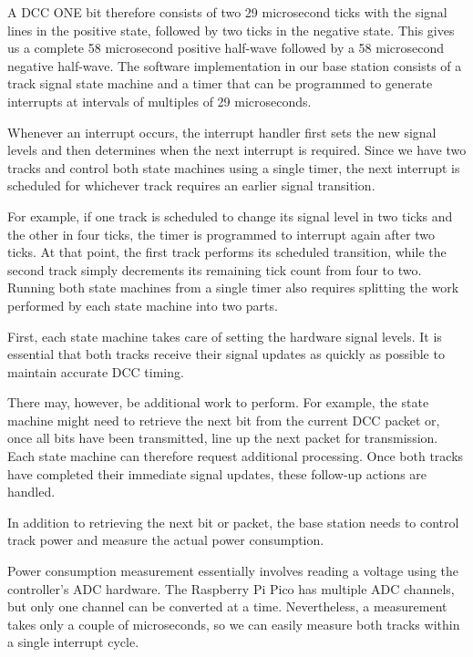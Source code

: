 A DCC ONE bit therefore consists of two 29 microsecond ticks with the signal lines in the positive state, followed by two ticks in the negative state. This gives us a complete 58 microsecond positive half-wave followed by a 58 microsecond negative half-wave.
The software implementation in our base station consists of a track signal state machine and a timer that can be programmed to generate interrupts at intervals of multiples of 29 microseconds.

Whenever an interrupt occurs, the interrupt handler first sets the new signal levels and then determines when the next interrupt is required. Since we have two tracks and control both state machines using a single timer, the next interrupt is scheduled for whichever track requires an earlier signal transition.

For example, if one track is scheduled to change its signal level in two ticks and the other in four ticks, the timer is programmed to interrupt again after two ticks. At that point, the first track performs its scheduled transition, while the second track simply decrements its remaining tick count from four to two.
Running both state machines from a single timer also requires splitting the work performed by each state machine into two parts.

First, each state machine takes care of setting the hardware signal levels. It is essential that both tracks receive their signal updates as quickly as possible to maintain accurate DCC timing.

There may, however, be additional work to perform. For example, the state machine might need to retrieve the next bit from the current DCC packet or, once all bits have been transmitted, line up the next packet for transmission. Each state machine can therefore request additional processing. Once both tracks have completed their immediate signal updates, these follow-up actions are handled.


In addition to retrieving the next bit or packet, the base station needs to control track power and measure the actual power consumption.

Power consumption measurement essentially involves reading a voltage using the controller’s ADC hardware. The Raspberry Pi Pico has multiple ADC channels, but only one channel can be converted at a time. Nevertheless, a measurement takes only a couple of microseconds, so we can easily measure both tracks within a single interrupt cycle.

